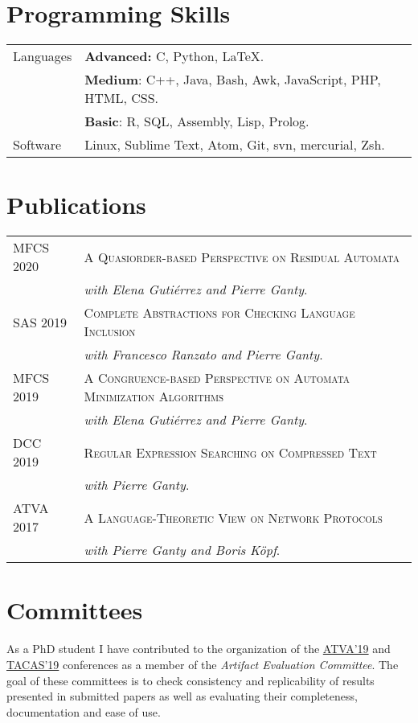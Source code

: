 \documentclass[a4paper,10pt]{article} %
\begin{document}
\section{Programming Skills}
\begin{tabular}{p{2.5cm}p{13.2cm}}
\small{Languages} & \textcolor{azureblue}{\textbf{Advanced:}} C, Python, \LaTeX.\\
[1pt]
& \textcolor{battleshipgrey}{\textbf{Medium}}: C++, Java, Bash, Awk, JavaScript, PHP, HTML, CSS.\\
& \textbf{Basic}: R, SQL, Assembly, Lisp, Prolog.\\
[3pt]
\small{Software} & Linux, Sublime Text, Atom, Git, svn, mercurial, Zsh.\\
\end{tabular}

\section{Publications}
\begin{tabular}{p{2.5cm}p{13.2cm}}
\small{MFCS 2020} & \textsc{A Quasiorder-based Perspective on Residual Automata} \\
& \textit{with Elena Gutiérrez and Pierre Ganty}. \\
[3pt]
\small{SAS 2019} & \textsc{Complete Abstractions for Checking Language Inclusion} \\
& \textit{with Francesco Ranzato and Pierre Ganty}. \\
[3pt]
\small{MFCS 2019} & \textsc{A Congruence-based Perspective on Automata Minimization Algorithms} \\
 & \textit{with Elena Gutiérrez and Pierre Ganty}. \\
[3pt]
\small{DCC 2019} & \textsc{Regular Expression Searching on Compressed Text} \\
 & \textit{with Pierre Ganty}. \\
[3pt]
\small{ATVA 2017} & \textsc{A Language-Theoretic View on Network Protocols} \\
& \textit{with Pierre Ganty and Boris Köpf}. \\
\end{tabular}

\section{Committees}
As a PhD student I have contributed to the organization of the \href{http://atva2019.iis.sinica.edu.tw/organization/}{ATVA'19} and \href{https://conf.researchr.org/track/etaps-2019/tacas-2019-papers#Artifact-Evaluation}{TACAS'19} conferences as a member of the \emph{Artifact Evaluation Committee}. 
The goal of these committees is to check consistency and replicability of results presented in submitted papers as well as evaluating their completeness, documentation and ease of use.
\end{document}
